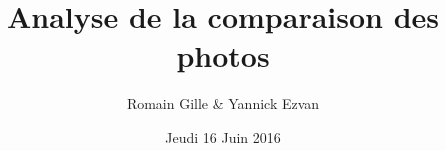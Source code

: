 
\renewcommand{\contentsname}{Table des matières}



\title{Analyse de la comparaison des photos}
\author{Romain Gille \& Yannick Ezvan}
\date{Jeudi 16 Juin 2016}
\maketitle
\tableofcontents

\newpage

\newpage

\newpage

\newpage

\newpage

\newpage

\newpage

\newpage

\newpage

\newpage

\newpage

\newpage

\newpage



